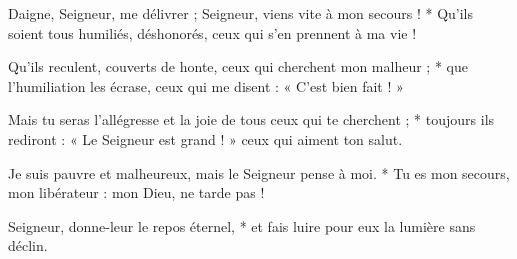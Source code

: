 \item Daigne, Seigneur, me délivrer ; Seigneur, viens vite à mon secours ! * Qu'ils soient tous humiliés, déshonorés, ceux qui s'en prennent à ma vie !

\item Qu'ils reculent, couverts de honte, ceux qui cherchent mon malheur ; * que l'humiliation les écrase, ceux qui me disent : « C'est bien fait ! »

\item Mais tu seras l'allégresse et la joie de tous ceux qui te cherchent ; * toujours ils rediront : « Le Seigneur est grand ! » ceux qui aiment ton salut.

\item Je suis pauvre et malheureux, mais le Seigneur pense à moi. * Tu es mon secours, mon libérateur : mon Dieu, ne tarde pas !

\item Seigneur, donne-leur le repos éternel, * et fais luire pour eux la lumière sans déclin.